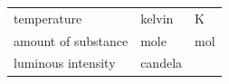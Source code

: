 {{\begin{center}
\begin{xtabular}[t]{|l|l|l|}
    
        temperature &
    
    
        kelvin &
    
    
        K%
     \tabularnewline{}
    
    
        amount of substance &
    
    
        mole &
    
    
        mol%
     \tabularnewline{}
    
    
        luminous intensity &
    
    
        candela &
    
    

\end{xtabular}
\end{center}}}
